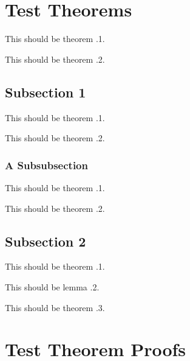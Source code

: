 
\section{Test Theorems}

\begin{theorem}
    This should be theorem \thesection.1.
\end{theorem}
\begin{theorem}
    This should be theorem \thesection.2.
\end{theorem}

\subsection{Subsection 1}

\begin{theorem}
    This should be theorem \thesubsection.1.
\end{theorem}
\begin{theorem}
    This should be theorem \thesubsection.2.
\end{theorem}

\subsubsection{A Subsubsection}

\begin{theorem}
    This should be theorem \thesubsubsection.1.
\end{theorem}
\begin{theorem}
    This should be theorem \thesubsubsection.2.
\end{theorem}

\subsection{Subsection 2}

\begin{theorem}
    This should be theorem \thesubsection.1.
\end{theorem}
\begin{lemma}
    This should be lemma \thesubsection.2.
\end{lemma}
\begin{theorem}
    This should be theorem \thesubsection.3.
\end{theorem}


\section{Test Theorem Proofs}

